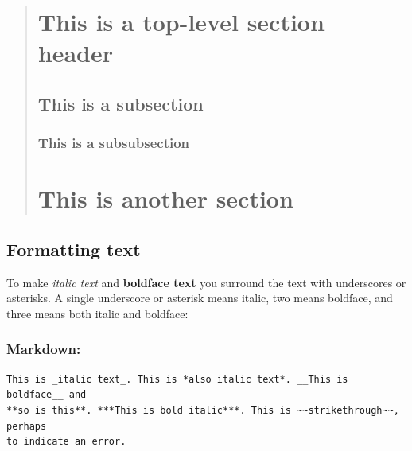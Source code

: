 \documentclass[
]{article}
\begin{document}
\begin{verbatim}
\end{verbatim}

\begin{quote}
\hypertarget{this-is-a-top-level-section-header}{%
\section{This is a top-level section
header}\label{this-is-a-top-level-section-header}}

\hypertarget{this-is-a-subsection}{%
\subsection{This is a subsection}\label{this-is-a-subsection}}

\hypertarget{this-is-a-subsubsection}{%
\subsubsection{This is a subsubsection}\label{this-is-a-subsubsection}}

\hypertarget{this-is-another-section}{%
\section{This is another section}\label{this-is-another-section}}
\end{quote}

\hypertarget{formatting-text}{%
\subsection{Formatting text}\label{formatting-text}}

To make \emph{italic text} and \textbf{boldface text} you surround the
text with underscores or asterisks. A single underscore or asterisk
means italic, two means boldface, and three means both italic and
boldface:

\hypertarget{markdown-3}{%
\subsubsection{Markdown:}\label{markdown-3}}

\begin{verbatim}
This is _italic text_. This is *also italic text*. __This is boldface__ and 
**so is this**. ***This is bold italic***. This is ~~strikethrough~~, perhaps 
to indicate an error.
\end{verbatim}
\end{document}

